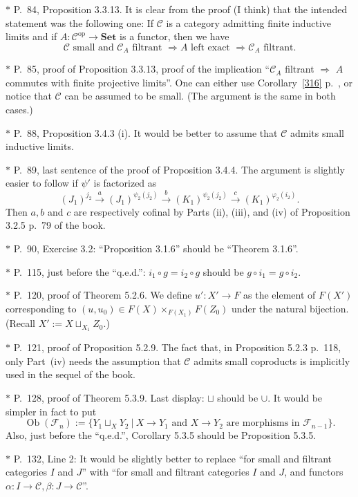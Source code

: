 \documentclass[12pt]{article}
\theoremstyle{remark}
\theoremstyle{definition}
\newcommand{\C}{\mathcal C}
\newcommand{\F}{\mathcal F}
\newcommand{\Set}{\mathbf{Set}}
\newcommand{\then}{\Rightarrow}
\newcommand{\xr}{\xrightarrow}
\DeclareMathOperator{\Ob}{Ob}
\DeclareMathOperator{\op}{op}
\begin{document}
\noindent $*$ P.~84, Proposition 3.3.13. It is clear from the proof (I think) that the intended statement was the following one: If $\C$ is a category admitting finite inductive limits and if $A:\C^{\op}\to\Set$ is a functor, then we have 
$$
\C\text{ small and }\C_A\text{ filtrant }\then A\text{ left exact }\then\C_A\text{ filtrant}.
$$

\noindent $*$ P.~85, proof of Proposition 3.3.13, proof of the implication ``$\C_A$ filtrant $\then$ $A$ commutes with finite projective limits''. One can either use Corollary~\ref{316} p.~\pageref{316}, or notice that $\C$ can be assumed to be small. (The argument is the same in both cases.)

\noindent $*$ P.~88, Proposition 3.4.3 (i). It would be better to assume that $\C$ admits small inductive limits.

\noindent $*$ P.~89, last sentence of the proof of Proposition 3.4.4. The argument is slightly easier to follow if $\psi'$ is factorized as 
$$
(J_1)^{j_2}\xr a(J_1)^{\psi_2(j_2)}\xr b(K_1)^{\psi_2(j_2)}\xr c(K_1)^{\varphi_2(i_2)}.
$$ 
Then $a,b$ and $c$ are respectively cofinal by Parts (ii), (iii), and (iv) of Proposition 3.2.5 p.~79 of the book.

\noindent $*$ P.~90, Exercise 3.2: ``Proposition 3.1.6'' should be ``Theorem 3.1.6''.

\noindent $*$ P.~115, just before the ``q.e.d.'': $i_1\circ g=i_2\circ g$ should be $g\circ i_1=g\circ i_2$.

\noindent $*$ P.~120, proof of Theorem 5.2.6. We define $u':X'\to F$ as the element of $F(X')$ corresponding to $(u,u_0)\in F(X)\times_{F(X_1)}F(Z_0)$ under the natural bijection. (Recall $X':=X\sqcup_{X_1}Z_0$.)

\noindent $*$ P.~121, proof of Proposition 5.2.9. The fact that, in Proposition 5.2.3 p.~118, only Part~(iv) needs the assumption that $\C$ admits small coproducts is implicitly used in the sequel of the book.

\noindent $*$ P.~128, proof of Theorem 5.3.9. Last display: $\sqcup$ should be $\cup$. It would be simpler in fact to put 
$$
\Ob(\F_n):=\{Y_1\sqcup_XY_2\ |\ X\to Y_1\text{ and }X\to Y_2\text{ are morphisms in }\F_{n-1}\}.
$$ 
Also, just before the ``q.e.d.'', Corollary 5.3.5 should be Proposition 5.3.5.

\noindent $*$ P.~132, Line 2: It would be slightly better to replace ``for small and filtrant categories $I$ and $J$'' with ``for small and filtrant categories $I$ and $J$, and functors $\alpha:I\to\C,\beta:J\to\C$''.
\end{document}
